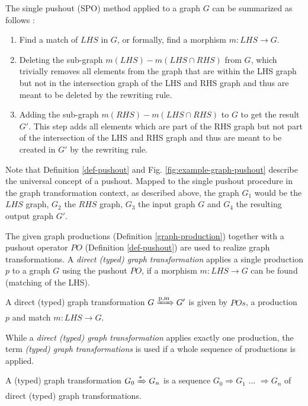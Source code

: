 \documentclass[runningheads]{llncs}
\begin{document}
\noindent
The single pushout (SPO) method applied to a graph $G$ can be summarized as follows \cite{MAHFOUDH2015212}:
\begin{enumerate}
	\item Find a match of $LHS$ in $G$, or formally, find a morphism $m : LHS \to G$.
	\item Deleting the sub-graph $m(LHS) - m(LHS \cap RHS)$ from $G$, which trivially removes all elements from the graph that are within the LHS graph but not in the intersection graph of the LHS and RHS graph and thus are meant to be deleted by the rewriting rule.
	\item Adding the sub-graph $m(RHS) - m(LHS \cap RHS)$ to $G$ to get the result $G'$. This step adds all elements which are part of the RHS graph but not part of the intersection of the LHS and RHS graph and thus are meant to be created in $G'$ by the rewriting rule.
\end{enumerate}

\noindent
Note that Definition \ref{def-pushout} and Fig. \ref{fig:example-graph-pushout} describe the universal concept of a pushout. Mapped to the single pushout procedure in the graph transformation context, as described above, the graph $G_1$ would be the $LHS$ graph, $G_2$ the $RHS$ graph, $G_3$ the input graph $G$ and $G_4$ the resulting output graph $G'$.

The given graph productions (Definition \ref{graph-production}) together with a pushout operator $PO$ (Definition \ref{def-pushout}) are used to realize graph transformations. A \textit{direct (typed) graph transformation} applies a single production $p$ to a graph $G$ using the pushout $PO$, if a morphism $m : LHS \to G$ can be found (matching of the LHS). 

\begin{definition}\label{tgt}
A direct (typed) graph transformation $G \xRightarrow{\text{p,m}} G'$ is given by $POs$, a production $p$ and match $m : LHS \to G$.
\end{definition}

\noindent
While a \textit{direct (typed) graph transformation} applies exactly one production, the term \textit{(typed) graph transformations} is used if a whole sequence of productions is applied.

\begin{definition}
A (typed) graph transformation $G_0 \xRightarrow{*} G_n$ is a sequence $G_0 \Rightarrow G_1$ ... $\Rightarrow G_n$ of direct (typed) graph transformations.
\end{definition}
\end{document}
